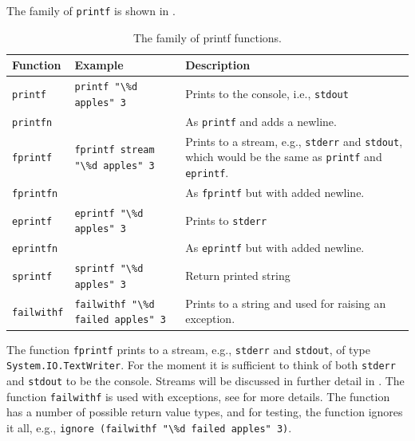 \documentclass[fsharpnotes.tex]{subfiles}
\begin{document}
The family of \lstinline!printf! is shown in .
\begin{table}
  \centering
  \begin{tabularx}{\linewidth}{|l|l|X|}
    \hline
    \rowcolor{headerRowColor} Function & Example & Description\\
    \hline
    \lstinline!printf! & \lstinline!printf "\%d apples" 3! & Prints to the console, i.e., \lstinline!stdout!\\
    \lstinline!printfn! &  & As \lstinline!printf! and adds a newline.\\
    \hline
    \lstinline!fprintf! & \lstinline!fprintf stream "\%d apples" 3! & Prints to a stream, e.g., \lstinline!stderr! and \lstinline!stdout!, which would be the same as \lstinline!printf! and \lstinline!eprintf!.\\
    \lstinline!fprintfn! & & As \lstinline!fprintf! but with added newline.\\
    \hline
    \lstinline!eprintf! & \lstinline!eprintf "\%d apples" 3! & Prints to \lstinline!stderr!\\
    \lstinline!eprintfn! & & As \lstinline!eprintf! but with added newline.\\
    \hline
    \lstinline!sprintf! & \lstinline!sprintf "\%d apples" 3! & Return printed string\\
    \hline
    \lstinline!failwithf! & \lstinline!failwithf "\%d failed apples" 3! & Prints to a string and used for raising an exception.\\
    \hline
  \end{tabularx}
  \caption{The family of printf functions.}
  \label{tab:printfFamily}
\end{table}
The function \lstinline!fprintf! prints to a stream, e.g., \lstinline!stderr! and \lstinline!stdout!, of type \lstinline!System.IO.TextWriter!. For the moment it is sufficient to think of both \lstinline!stderr! and \lstinline!stdout! to be the console. Streams will be discussed in further detail in . The function \lstinline!failwithf! is used with exceptions, see  for more details. The function has a number of possible return value types, and for testing, the  function ignores it all, e.g., \mbox{\lstinline!ignore (failwithf "\%d failed apples" 3)!}.
\end{document}
